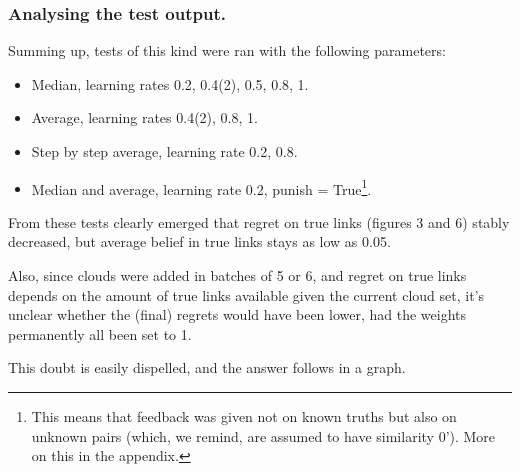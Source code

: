 \documentclass[11pt]{article}
\begin{document}
\subsubsection{Analysing the test output.}

Summing up, tests of this kind were ran with the following parameters:

\begin{itemize}
\item Median, learning rates 0.2, 0.4(2), 0.5, 0.8, 1.

\item Average, learning rates 0.4(2), 0.8, 1.

\item Step by step average, learning rate 0.2, 0.8.

\item Median and average, learning rate 0.2, punish = True\footnote{This means that feedback was given not on known truths but also on unknown pairs (which, we remind, are assumed to have similarity $0$'). More on this in the appendix.}.
\end{itemize}

From these tests clearly emerged that regret on true links (figures 3 and 6) stably decreased, but average belief in true links stays as low as 0.05.

Also, since clouds were added in batches of 5 or 6, and regret on true links depends on the amount of true links available given the current cloud set, it's unclear whether the (final) regrets would have been lower, had the weights permanently all been set to 1.

This doubt is easily dispelled, and the answer follows in a graph. 
\end{document}
